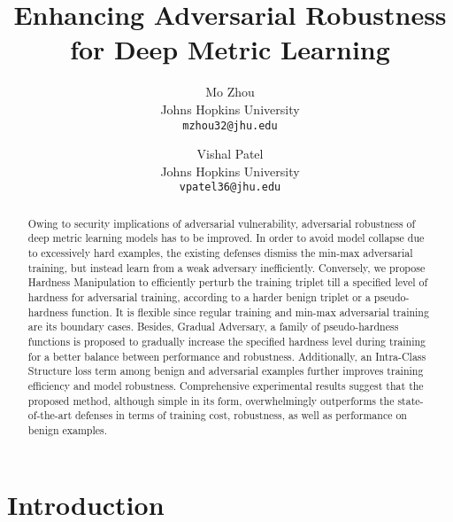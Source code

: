 \documentclass[10pt,twocolumn,letterpaper]{article}
\begin{document}
\title{Enhancing Adversarial Robustness for Deep Metric Learning}

\author{Mo Zhou\\
Johns Hopkins University\\
{\tt\small mzhou32@jhu.edu}
\and
Vishal Patel\\
Johns Hopkins University\\
{\tt\small vpatel36@jhu.edu}
}
\maketitle

\begin{abstract}
	Owing to security implications of adversarial vulnerability, adversarial
	robustness of deep metric learning models has to be improved.
	In order to avoid model collapse due to excessively hard examples, the
	existing defenses dismiss the min-max adversarial training, but instead
	learn from a weak adversary inefficiently.
	Conversely, we propose Hardness Manipulation to efficiently perturb the
	training triplet till a specified level of hardness for adversarial
	training, according to a harder benign triplet or a pseudo-hardness
	function.
	It is flexible since regular training and min-max adversarial training
	are its boundary cases.
	Besides, Gradual Adversary, a family of pseudo-hardness functions is
	proposed to gradually increase the specified hardness level during training
	for a better balance between performance and robustness.
	Additionally, an Intra-Class Structure loss term among benign and adversarial
	examples further improves training efficiency and model robustness.
	Comprehensive experimental results suggest that the proposed method,
	although simple in its form, overwhelmingly outperforms the
	state-of-the-art defenses in terms of training cost,
	robustness, as well as performance on benign examples.
%
\end{abstract}

\section{Introduction}
\label{sec:1}
\end{document}
